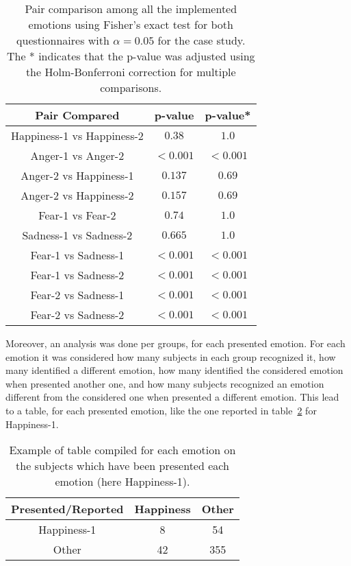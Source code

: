 \begin{table}
\centering
\small
\caption{Pair comparison among all the implemented emotions using Fisher's exact test for both questionnaires with $\alpha = 0.05$ for the  case study. The * indicates that the p-value was adjusted using the Holm-Bonferroni correction for multiple comparisons.}
		\label{table:result_compare_fourth}
		\begin{tabular}{|c|c|c|}
			\hline	
\textbf{Pair Compared} & \textbf{p-value} & \textbf{p-value*}\\	
			\hline
			Happiness-1 vs Happiness-2 &$0.38$&$1.0$\\
			\hline
			Anger-1 vs Anger-2 & $<0.001$ 
			& $<0.001$
			\\
			\hline
			Anger-2 vs Happiness-1 & $0.137$&$0.69$\\
			\hline
			Anger-2 vs Happiness-2 & $0.157$&$0.69$\\
			\hline
			Fear-1 vs Fear-2 & $0.74$&$1.0$\\
			\hline
			Sadness-1 vs Sadness-2 & $0.665$&$1.0$\\
			\hline
			Fear-1 vs Sadness-1& $<0.001$ 
			& $<0.001$
			\\
			\hline
			Fear-1 vs Sadness-2 & $<0.001$
			& $<0.001$
			\\
			\hline
			Fear-2 vs Sadness-1 & $<0.001$
			& $<0.001$
			\\
			\hline
			Fear-2 vs Sadness-2 & $<0.001$
			& $<0.001$
			\\
			\hline
			\end{tabular}
\end{table} 
Moreover, an analysis was done per groups, for each presented emotion. For each emotion it was considered how many subjects in each group recognized it, how many identified a different emotion, how many identified the considered emotion when presented another one, and how many subjects recognized an emotion different from the considered one when presented a different emotion. This lead to a table, for each presented emotion, like the one reported in table~\ref{table:singleEmotion} for Happiness-1. 
\begin{table}[!htbp]
\begin{center}
\caption{Example of table compiled for each emotion on the subjects which have been presented each emotion (here Happiness-1).}
\label{table:singleEmotion}
\begin{tabular}{|c|c|c|}
\hline 
Presented/Reported&Happiness&Other\\
\hline 
Happiness-1&8&54\\
\hline 
Other&42&355\\
\hline
\end{tabular}
\end{center}
\end{table}

